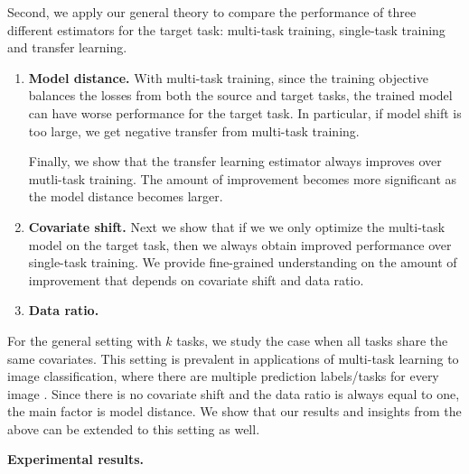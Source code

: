 \smallskip
{}
	Second, we apply our general theory to compare the performance of three different estimators for the target task: multi-task training, single-task training and transfer learning.
	\begin{enumerate}
		\item {\bf Model distance.} With multi-task training, since the training objective balances the losses from both the source and target tasks, the trained model can have worse performance for the target task.
	In particular, if model shift is too large, we get negative transfer from multi-task training.

	Finally, we show that the transfer learning estimator always improves over mutli-task training.
		The amount of improvement becomes more significant as the model distance becomes larger.
		\item {\bf Covariate shift.} Next we show that if we we only optimize the multi-task model on the target task, then we always obtain improved performance over single-task training.
		We provide fine-grained understanding on the amount of improvement that depends on covariate shift and data ratio.
		\item {\bf Data ratio.}
	\end{enumerate}

	For the general setting with $k$ tasks, we study the case when all tasks share the same covariates.
This setting is prevalent in applications of multi-task learning to image classification, where there are multiple prediction labels/tasks for every image \cite{EA20}.
	Since there is no covariate shift and the data ratio is always equal to one, the main factor is model distance.
	We show that our results and insights from the above can be extended to this setting as well.

\smallskip
\noindent\textbf{Experimental results.}